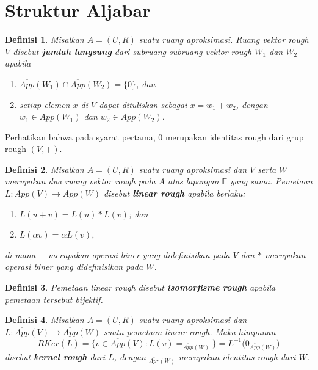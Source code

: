 \documentclass[a4paper,11pt]{article}
\theoremstyle{plain}
\newtheorem{definisi}{Definisi}
\newcommand{\F}{\mathbb{F}}
\newcommand{\upp}[1]{\overline{App}(#1)}
\newcommand{\upr}[1]{\overline{Apr}(#1)}
\begin{document}
\section{Struktur Aljabar}

\begin{definisi}\label{def:24}
      Misalkan $A=(U,R)$ suatu ruang aproksimasi. Ruang vektor rough $V$
      disebut \textbf{jumlah langsung} dari subruang-subruang vektor rough
      $W_1$ dan $W_2$ apabila
      \begin{enumerate}
            \item $\upp{W_1}\cap\upp{W_2}=\{0\}$, dan
            \item setiap elemen $x$ di $V$ dapat dituliskan sebagai $x=w_1+w_2$,
                  dengan $w_1\in\upp{W_1}$ dan $w_2\in\upp{W_2}$.
      \end{enumerate}
\end{definisi}
Perhatikan bahwa pada syarat pertama, $0$ merupakan identitas rough
dari grup rough $(V,+)$.

\begin{definisi}\label{def:25}
      Misalkan $A=(U,R)$ suatu ruang aproksimasi dan $V$ serta $W$ merupakan
      dua ruang vektor rough pada $A$ atas lapangan $\F$ yang sama.
      Pemetaan $L:\upp{V}\to\upp{W}$ disebut \textbf{linear rough}
      apabila berlaku:
      \begin{enumerate}
            \item $L(u+v)=L(u)*L(v)$; dan
            \item $L(\alpha v)=\alpha L(v)$,
      \end{enumerate}
      di mana $+$ merupakan operasi biner yang didefinisikan pada $V$ dan
      $*$ merupakan operasi biner yang didefinisikan pada $W$.
\end{definisi}

\begin{definisi}\label{def:26}
      Pemetaan linear rough disebut \textbf{isomorfisme rough} apabila
      pemetaan tersebut bijektif.
\end{definisi}

\begin{definisi}\label{def:27}
      Misalkan $A=(U,R)$ suatu ruang aproksimasi dan
      $L:\upp{V}\to\upp{W}$ suatu pemetaan linear rough. Maka himpunan
      \[
            RKer(L)=\{v\in\upp{V}:L(v)=_{\upp{W}}\}
            =L^{-1}\bigl(0_{\upp{W}}\bigr)
      \]
      disebut \textbf{kernel rough} dari $L$, dengan $_{\upr{W}}$
      merupakan identitas rough dari $W$.
\end{definisi}
\end{document}

